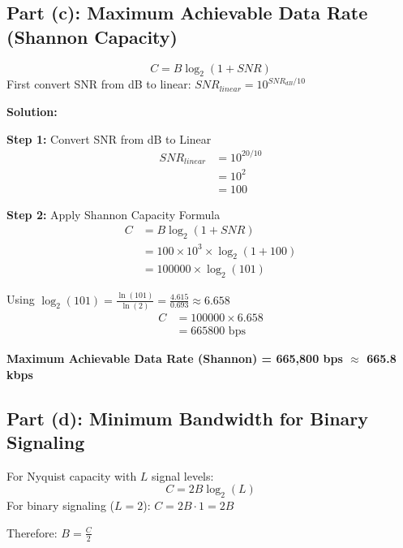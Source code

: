 \documentclass[12pt,a4paper]{article}
\begin{document}
\subsection{Part (c): Maximum Achievable Data Rate (Shannon Capacity)}

\begin{formulabox}
\[C = B \log_2(1 + SNR)\]
First convert SNR from dB to linear: $SNR_{linear} = 10^{SNR_{dB}/10}$
\end{formulabox}

\textbf{Solution:}

\textbf{Step 1:} Convert SNR from dB to Linear
\begin{align*}
SNR_{linear} &= 10^{20/10} \\[1em]
&= 10^2 \\[1em]
&= 100
\end{align*}

\textbf{Step 2:} Apply Shannon Capacity Formula
\begin{align*}
C &= B \log_2(1 + SNR) \\[1em]
&= 100 \times 10^3 \times \log_2(1 + 100) \\[1em]
&= 100000 \times \log_2(101)
\end{align*}

Using $\log_2(101) = \frac{\ln(101)}{\ln(2)} = \frac{4.615}{0.693} \approx 6.658$
\begin{align*}
C &= 100000 \times 6.658 \\[1em]
&= 665800 \text{ bps}
\end{align*}

\begin{answerbox}
\textbf{Maximum Achievable Data Rate (Shannon) = 665,800 bps $\approx$ 665.8 kbps}
\end{answerbox}

\subsection{Part (d): Minimum Bandwidth for Binary Signaling}

\begin{formulabox}
For Nyquist capacity with $L$ signal levels:
\[C = 2B \log_2(L)\]
For binary signaling ($L = 2$): $C = 2B \cdot 1 = 2B$

Therefore: $B = \frac{C}{2}$
\end{formulabox}
\end{document}
